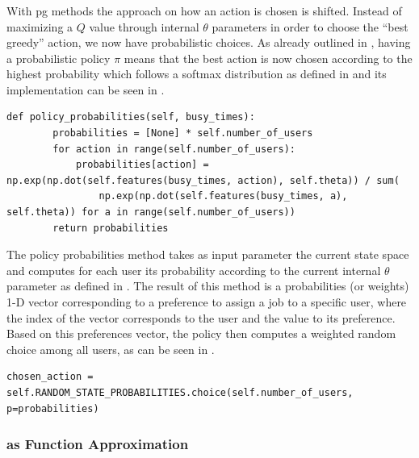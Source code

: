 \subsubsection{}

With \gls{pg} methods the approach on how an action is chosen is shifted. Instead of maximizing a $Q$ value through internal $\theta$ parameters in order to choose the ``best greedy'' action, we now have probabilistic choices. As already outlined in , having a probabilistic policy $\pi$ means that the best action is now chosen according to the highest probability which follows a softmax distribution as defined in  and its implementation can be seen in .

\begin{lstlisting}[caption=Softmax distribution of preferences probabilities,label=lst:softmax_probabilities,style=CustomPython]
    def policy_probabilities(self, busy_times):
        probabilities = [None] * self.number_of_users
        for action in range(self.number_of_users):
            probabilities[action] = np.exp(np.dot(self.features(busy_times, action), self.theta)) / sum(
                np.exp(np.dot(self.features(busy_times, a), self.theta)) for a in range(self.number_of_users))
        return probabilities
\end{lstlisting}

The policy probabilities method takes as input parameter the current state space and computes for each user its probability according to the current internal $\theta$ parameter as defined in . The result of this method is a probabilities (or weights) 1-D vector corresponding to a preference to assign a job to a specific user, where the index of the vector corresponds to the user and the value to its preference. Based on this preferences vector, the policy then computes a weighted random choice among all users, as can be seen in .

\begin{lstlisting}[caption=Probabilistic user choice,label=lst:prob_user_choice,style=CustomPython]
	chosen_action = self.RANDOM_STATE_PROBABILITIES.choice(self.number_of_users, p=probabilities)
\end{lstlisting}

\subsubsection{ as Function Approximation}

